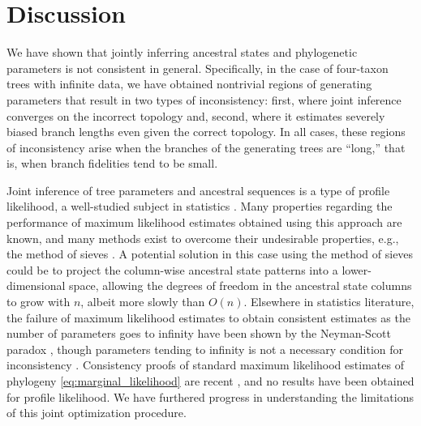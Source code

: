\documentclass{article}
\newcommand{\nCols}{n}
\begin{document}
\section*{Discussion}

We have shown that jointly inferring ancestral states and phylogenetic parameters \cite{Sagulenko2017-jo} is not consistent in general.
Specifically, in the case of four-taxon trees with infinite data, we have obtained nontrivial regions of generating parameters that result in two types of inconsistency: first, where joint inference converges on the incorrect topology and, second, where it estimates severely biased branch lengths even given the correct topology.
In all cases, these regions of inconsistency arise when the branches of the generating trees are ``long,'' that is, when branch fidelities tend to be small.

Joint inference of tree parameters and ancestral sequences is a type of profile likelihood, a well-studied subject in statistics \cite{Murphy2000-ry}.
Many properties regarding the performance of maximum likelihood estimates obtained using this approach are known, and many methods exist to overcome their undesirable properties, e.g., the method of sieves \cite{Geman1982}.
A potential solution in this case using the method of sieves could be to project the column-wise ancestral state patterns into a lower-dimensional space, allowing the degrees of freedom in the ancestral state columns to grow with $\nCols$, albeit more slowly than $O(\nCols)$.
Elsewhere in statistics literature, the failure of maximum likelihood estimates to obtain consistent estimates as the number of parameters goes to infinity have been shown by the Neyman-Scott paradox \cite{Neyman1948-tt}, though parameters tending to infinity is not a necessary condition for inconsistency \cite{LeCam1990}.
Consistency proofs of standard maximum likelihood estimates of phylogeny \eqref{eq:marginal_likelihood} are recent \cite{RoyChoudhury2015-ta}, and no results have been obtained for profile likelihood.
We have furthered progress in understanding the limitations of this joint optimization procedure.
\end{document}

